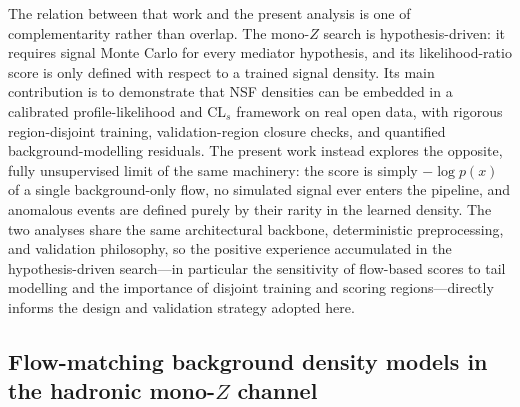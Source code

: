 \documentclass[11pt,a4paper,twocolumn]{article}
\begin{document}
The relation between that work and the present analysis is one of complementarity rather than overlap. The mono-$Z$ search is hypothesis-driven: it requires signal Monte Carlo for every mediator hypothesis, and its likelihood-ratio score is only defined with respect to a trained signal density. Its main contribution is to demonstrate that NSF densities can be embedded in a calibrated profile-likelihood and CL$_s$ framework on real open data, with rigorous region-disjoint training, validation-region closure checks, and quantified background-modelling residuals. The present work instead explores the opposite, fully unsupervised limit of the same machinery: the score is simply $-\log p(x)$ of a single background-only flow, no simulated signal ever enters the pipeline, and anomalous events are defined purely by their rarity in the learned density. The two analyses share the same architectural backbone, deterministic preprocessing, and validation philosophy, so the positive experience accumulated in the hypothesis-driven search---in particular the sensitivity of flow-based scores to tail modelling and the importance of disjoint training and scoring regions---directly informs the design and validation strategy adopted here.

\subsection{Flow-matching background density models in the hadronic mono-$Z$ channel}
\label{sec:lit-nsf-htmht}
\end{document}
